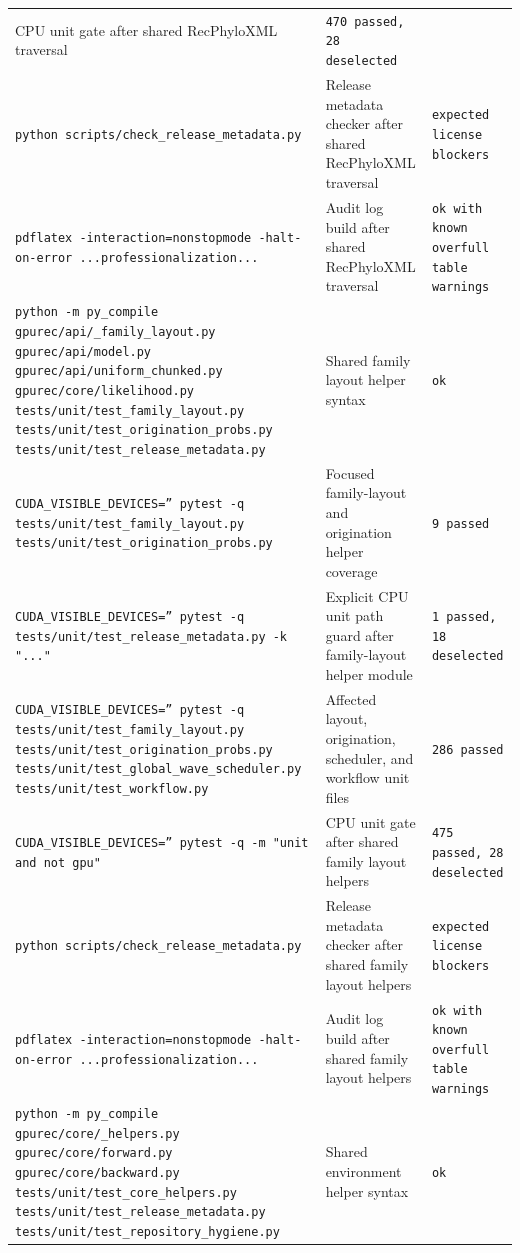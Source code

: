 \documentclass[11pt]{article}
\begin{document}
\begin{center}
\begin{tabular}{lll}
CPU unit gate after shared RecPhyloXML traversal &
\texttt{470 passed, 28 deselected} \\
\texttt{python scripts/check\_release\_metadata.py} &
Release metadata checker after shared RecPhyloXML traversal &
\texttt{expected license blockers} \\
\texttt{pdflatex -interaction=nonstopmode -halt-on-error ...professionalization...} &
Audit log build after shared RecPhyloXML traversal &
\texttt{ok with known overfull table warnings} \\
\texttt{python -m py\_compile gpurec/api/\_family\_layout.py gpurec/api/model.py gpurec/api/uniform\_chunked.py gpurec/core/likelihood.py tests/unit/test\_family\_layout.py tests/unit/test\_origination\_probs.py tests/unit/test\_release\_metadata.py} &
Shared family layout helper syntax &
\texttt{ok} \\
\texttt{CUDA\_VISIBLE\_DEVICES='' pytest -q tests/unit/test\_family\_layout.py tests/unit/test\_origination\_probs.py} &
Focused family-layout and origination helper coverage &
\texttt{9 passed} \\
\texttt{CUDA\_VISIBLE\_DEVICES='' pytest -q tests/unit/test\_release\_metadata.py -k "..."} &
Explicit CPU unit path guard after family-layout helper module &
\texttt{1 passed, 18 deselected} \\
\texttt{CUDA\_VISIBLE\_DEVICES='' pytest -q tests/unit/test\_family\_layout.py tests/unit/test\_origination\_probs.py tests/unit/test\_global\_wave\_scheduler.py tests/unit/test\_workflow.py} &
Affected layout, origination, scheduler, and workflow unit files &
\texttt{286 passed} \\
\texttt{CUDA\_VISIBLE\_DEVICES='' pytest -q -m "unit and not gpu"} &
CPU unit gate after shared family layout helpers &
\texttt{475 passed, 28 deselected} \\
\texttt{python scripts/check\_release\_metadata.py} &
Release metadata checker after shared family layout helpers &
\texttt{expected license blockers} \\
\texttt{pdflatex -interaction=nonstopmode -halt-on-error ...professionalization...} &
Audit log build after shared family layout helpers &
\texttt{ok with known overfull table warnings} \\
\texttt{python -m py\_compile gpurec/core/\_helpers.py gpurec/core/forward.py gpurec/core/backward.py tests/unit/test\_core\_helpers.py tests/unit/test\_release\_metadata.py tests/unit/test\_repository\_hygiene.py} &
Shared environment helper syntax &
\texttt{ok} \\

\end{tabular}
\end{center}
\end{document}
